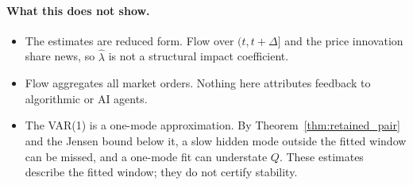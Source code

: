 \documentclass[10pt,twocolumn,letterpaper]{article}
\theoremstyle{definition}
\theoremstyle{remark}
\begin{document}
\paragraph{What this does not show.}
\begin{itemize}
 \item The estimates are reduced form. Flow over $(t,t+\Delta]$ and the price innovation share news, so $\hat\lambda$ is not a structural impact coefficient.
 \item Flow aggregates all market orders. Nothing here attributes feedback to algorithmic or AI agents.
 \item The VAR(1) is a one-mode approximation. By Theorem~\ref{thm:retained_pair} and the Jensen bound below it, a slow hidden mode outside the fitted window can be missed, and a one-mode fit can understate $Q$. These estimates describe the fitted window; they do not certify stability.
\end{itemize}

\begin{table}[htbp]\centering\scriptsize
\caption{Cross-venue replication: Coinbase Pro versus Binance Spot across eleven identical calendar days (8--18 April 2021). 95\% Student-$t$ confidence intervals across day replicates.}
\label{tab:cross_venue}

\end{table}

\begin{table}[htbp]\centering\scriptsize
\caption{Systematic multi-year panel on Binance Spot (2021--2024, 768 asset-days). Baseline $\hat Q$, $\hat Q_{30}$ (order-splitting controlled), $\hat S$, loop ratio $\hat{\mathcal L}$, structural SMM $Q_{\text{SMM}}$, and Rigobon heteroskedasticity $Q_{\text{Rig}}$. 95\% clustered intervals across dates and assets.}
\label{tab:binance_panel}

\end{table}

\begin{table}[htbp]\centering\scriptsize
\caption{Sub-period breakdown across market epochs (192 asset-days per epoch across eight assets). $\hat Q$ and $\hat S$ with 95\% clustered confidence intervals; structural SMM $Q_{\text{SMM}}$; share of asset-days with $\hat Q>0$.}
\label{tab:binance_regimes}

\end{table}

\begin{table}[htbp]\centering\scriptsize
\caption{Order-splitting memory exponent $\gamma$, long-lag controls $\hat Q_L$, and robust identified sets $[Q_{\min}, Q_{\max}]$ allowing for hidden slow-learning attenuation.}
\label{tab:flow_memory_bias}

\end{table}
\end{document}
